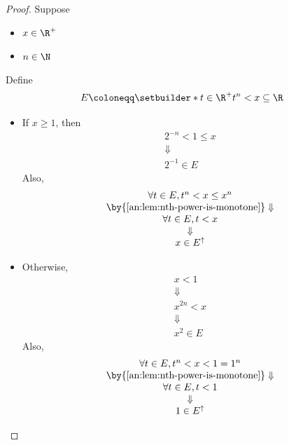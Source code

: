 \begin{proof}
  Suppose
  \begin{itemize}
    \item $x \in \R^{+}$
    \item $n \in \N$
  \end{itemize}
  Define
  \[
    E \coloneqq \setbuilder*{t \in \R^{+}}{t^{n} < x} \subseteq \R
  \]
  \begin{itemize}
    \item If $x \geq 1$, then
          \[
            \begin{array}{c}
              2^{-n} < 1 \leq x \\
              \Downarrow        \\
              2^{-1} \in E
            \end{array}
          \]
          Also,
          \[
            \begin{array}{c}
              \forall t \in E, t^{n} < x \leq x^{n}               \\
              \by{\Cref{an:lem:nth-power-is-monotone}} \Downarrow \\
              \forall t \in E, t < x                              \\
              \Downarrow                                          \\
              x \in E^{\uparrow}
            \end{array}
          \]
    \item Otherwise,
          \[
            \begin{array}{c}
              x < 1      \\
              \Downarrow \\
              x^{2n} < x \\
              \Downarrow \\
              x^{2} \in E
            \end{array}
          \]
          Also,
          \[
            \begin{array}{c}
              \forall t \in E, t^{n} < x < 1 = 1^{n}              \\
              \by{\Cref{an:lem:nth-power-is-monotone}} \Downarrow \\
              \forall t \in E, t < 1                              \\
              \Downarrow                                          \\
              1 \in E^{\uparrow}
            \end{array}
\]
\end{itemize}
\end{proof}

